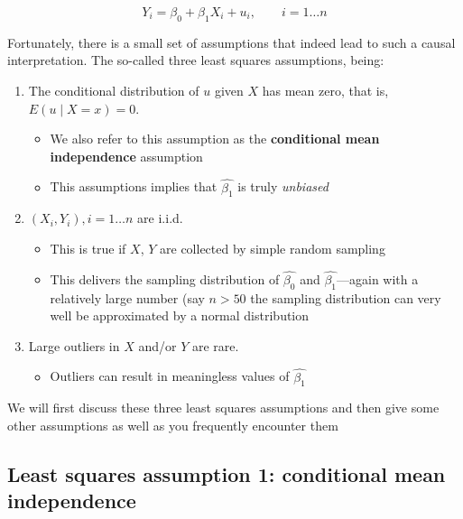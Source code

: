 \documentclass[
]{book}
\providecommand{\tightlist}{%
  \setlength{\itemsep}{0pt}\setlength{\parskip}{0pt}}
\begin{document}
\begin{equation}
Y_i = \beta_0 + \beta_1 X_i + u_i, \qquad i = 1 \dots n
\label{eq:betacausal}
\end{equation}

Fortunately, there is a small set of assumptions that indeed lead to such a causal interpretation. The so-called three least squares assumptions, being:

\begin{enumerate}
\def\labelenumi{\arabic{enumi}.}
\tightlist
\item
  The conditional distribution of \(u\) given \(X\) has mean zero, that is, \(E(u \mid X = x) = 0\).

  \begin{itemize}
  \tightlist
  \item
    We also refer to this assumption as the \textbf{conditional mean independence} assumption
  \item
    This assumptions implies that \(\hat{\beta_1}\) is truly \emph{unbiased}
  \end{itemize}
\item
  \((X_i,Y_i), i =1 \ldots n\) are i.i.d.

  \begin{itemize}
  \tightlist
  \item
    This is true if \(X\), \(Y\) are collected by simple random sampling
  \item
    This delivers the sampling distribution of \(\hat{\beta_0}\) and \(\hat{\beta_1}\)---again with a relatively large number (say \(n > 50\) the sampling distribution can very well be approximated by a normal distribution
  \end{itemize}
\item
  Large outliers in \(X\) and/or \(Y\) are rare.

  \begin{itemize}
  \tightlist
  \item
    Outliers can result in meaningless values of \(\hat{\beta_1}\)
  \end{itemize}
\end{enumerate}

We will first discuss these three least squares assumptions and then give some other assumptions as well as you frequently encounter them

\hypertarget{least-squares-assumption-1-conditional-mean-independence}{%
\subsection{Least squares assumption 1: conditional mean independence}\label{least-squares-assumption-1-conditional-mean-independence}}
\end{document}

